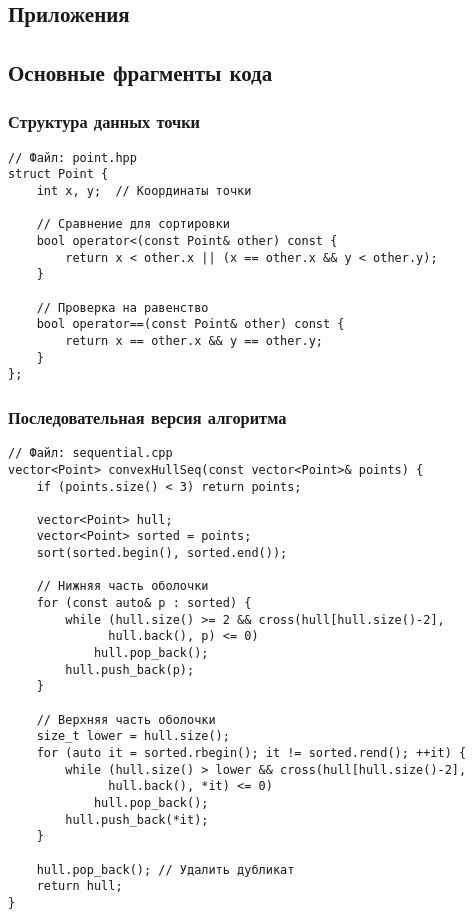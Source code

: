 \documentclass[12pt]{article}
\begin{document}
\newpage
\begin{appendices}
\section{Приложения}

\subsection{Основные фрагменты кода}

\subsubsection{Структура данных точки}
\begin{verbatim}
// Файл: point.hpp
struct Point {
    int x, y;  // Координаты точки
    
    // Сравнение для сортировки
    bool operator<(const Point& other) const {
        return x < other.x || (x == other.x && y < other.y);
    }
    
    // Проверка на равенство
    bool operator==(const Point& other) const {
        return x == other.x && y == other.y;
    }
};
\end{verbatim}

\subsubsection{Последовательная версия алгоритма}
\begin{verbatim}
// Файл: sequential.cpp
vector<Point> convexHullSeq(const vector<Point>& points) {
    if (points.size() < 3) return points;
    
    vector<Point> hull;
    vector<Point> sorted = points;
    sort(sorted.begin(), sorted.end());
    
    // Нижняя часть оболочки
    for (const auto& p : sorted) {
        while (hull.size() >= 2 && cross(hull[hull.size()-2], 
              hull.back(), p) <= 0)
            hull.pop_back();
        hull.push_back(p);
    }
    
    // Верхняя часть оболочки
    size_t lower = hull.size();
    for (auto it = sorted.rbegin(); it != sorted.rend(); ++it) {
        while (hull.size() > lower && cross(hull[hull.size()-2],
              hull.back(), *it) <= 0)
            hull.pop_back();
        hull.push_back(*it);
    }
    
    hull.pop_back(); // Удалить дубликат
    return hull;
}
\end{verbatim}


\end{appendices}
\end{document}
